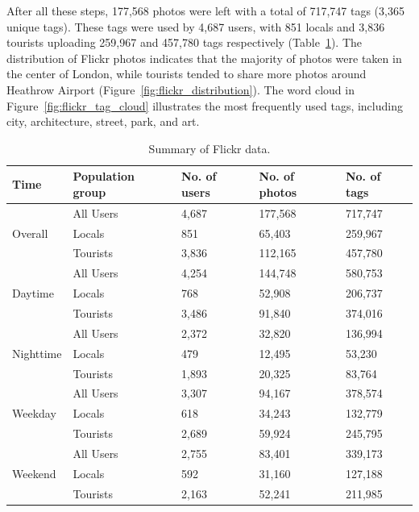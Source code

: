 \documentclass{article}
\theoremstyle{remark}
\begin{document}
After all these steps, 177,568 photos were left with a total of 717,747 tags (3,365 unique tags). These tags were used by 4,687 users, with 851 locals and 3,836 tourists uploading 259,967 and 457,780 tags respectively (Table~\ref{tab:flickr_summary}). The distribution of Flickr photos indicates that the majority of photos were taken in the center of London, while tourists tended to share more photos around Heathrow Airport (Figure~\ref{fig:flickr_distribution}). The word cloud in Figure~\ref{fig:flickr_tag_cloud} illustrates the most frequently used tags, including city, architecture, street, park, and art.


\begin{table}[h!]
\centering
\caption{\label{tab:flickr_summary}Summary of Flickr data.}
\begin{tabular}{lllll} \hline
Time & Population group & No. of users & No. of photos & No. of tags \\
\hline
\multirow{3}{*}{Overall} 
& All Users & 4,687 & 177,568 & 717,747 \\
& Locals & 851 & 65,403 & 259,967 \\
& Tourists & 3,836 & 112,165 & 457,780 \\
\hline
\multirow{3}{*}{Daytime} 
& All Users & 4,254 & 144,748 & 580,753 \\
& Locals & 768 & 52,908 & 206,737 \\
& Tourists & 3,486 & 91,840 & 374,016 \\
\hline
\multirow{3}{*}{Nighttime} 
& All Users & 2,372 & 32,820 & 136,994 \\
& Locals & 479 & 12,495 & 53,230 \\
& Tourists & 1,893 & 20,325 & 83,764 \\
\hline
\multirow{3}{*}{Weekday} 
& All Users & 3,307 & 94,167 & 378,574 \\
& Locals & 618 & 34,243 & 132,779 \\
& Tourists & 2,689 & 59,924 & 245,795 \\
\hline
\multirow{3}{*}{Weekend} 
& All Users & 2,755 & 83,401 & 339,173 \\
& Locals & 592 & 31,160 & 127,188 \\
& Tourists & 2,163 & 52,241 & 211,985 \\
\hline
\end{tabular}
\end{table}
\end{document}
